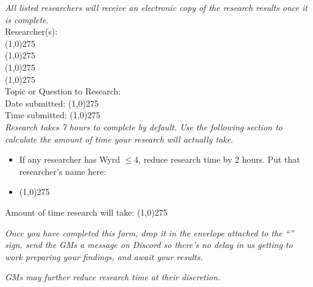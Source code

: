 \documentclass[green]{gl2018}
\begin{document}
\name{\gResearchForm{}}

\emph{All listed researchers will receive an electronic copy of the research results once it is complete.}\\
Researcher(s):\\
\line(1,0){275} \\
\line(1,0){275} \\
\line(1,0){275} \\
\line(1,0){275} \\

Topic or Question to Research:\\
Date submitted:  \line(1,0){275}\\
Time submitted:  \line(1,0){275}\\

\emph{Research takes 7 hours to complete by default. Use the following section to calculate the amount of time your research will actually take.}
\begin{itemize} \item If any researcher has Wyrd $\le 4$, reduce research time by 2 hours.  Put that researcher's name here:
\item\line(1,0){275}
\end{itemize}

Amount of time research will take: \line(1,0){275}

\emph{Once you have completed this form, drop it in the envelope attached to the ``\sResearchFormSubmission{\MYname{}}'' sign, send the GMs a message on Discord so there's no delay in us getting to work preparing your findings, and await your results.}

{\it GMs may further reduce research time at their discretion.}
\end{document}
